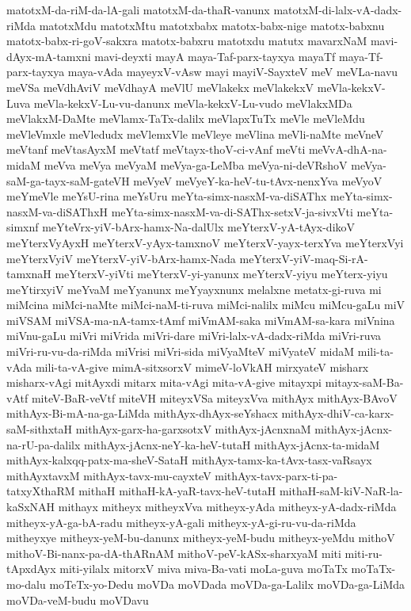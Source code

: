 {matotxM-da-riM-da-lA-gali
matotxM-da-thaR-vanunx
matotxM-di-lalx-vA-dadx-riMda
matotxMdu
matotxMtu
matotxbabx
matotx-babx-nige
matotx-babxnu
matotx-babx-ri-goV-sakxra
matotx-babxru
matotxdu
matutx
mavarxNaM
mavi-dAyx-mA-tamxni
mavi-deyxti
mayA
maya-Taf-parx-tayxya
mayaTf
maya-Tf-parx-tayxya
maya-vAda
mayeyxV-vAsw
mayi
mayiV-SayxteV
meV
meVLa-navu
meVSa
meVdhAviV
meVdhayA
meVlU
meVlakekx
meVlakekxV
meVla-kekxV-Luva
meVla-kekxV-Lu-vu-danunx
meVla-kekxV-Lu-vudo
meVlakxMDa
meVlakxM-DaMte
meVlamx-TaTx-dalilx
meVlapxTuTx
meVle
meVleMdu
meVleVmxle
meVledudx
meVlemxVle
meVleye
meVlina
meVli-naMte
meVneV
meVtanf
meVtasAyxM
meVtatf
meVtayx-thoV-ci-vAnf
meVti
meVvA-dhA-na-midaM
meVva
meVya
meVyaM
meVya-ga-LeMba
meVya-ni-deVRshoV
meVya-saM-ga-tayx-saM-gateVH
meVyeV
meVyeY-ka-heV-tu-tAvx-nenxYva
meVyoV
meYmeVle
meYsU-rina
meYsUru
meYta-simx-nasxM-va-diSAThx
meYta-simx-nasxM-va-diSAThxH
meYta-simx-nasxM-va-di-SAThx-setxV-ja-sivxVti
meYta-simxnf
meYteVrx-yiV-bArx-hamx-Na-dalUlx
meYterxV-yA-tAyx-dikoV
meYterxVyAyxH
meYterxV-yAyx-tamxnoV
meYterxV-yayx-terxYva
meYterxVyi
meYterxVyiV
meYterxV-yiV-bArx-hamx-Nada
meYterxV-yiV-maq-Si-rA-tamxnaH
meYterxV-yiVti
meYterxV-yi-yanunx
meYterxV-yiyu
meYterx-yiyu
meYtirxyiV
meYvaM
meYyanunx
meYyayxnunx
melalxne
metatx-gi-ruva
mi
miMcina
miMci-naMte
miMci-naM-ti-ruva
miMci-nalilx
miMcu
miMcu-gaLu
miV
miVSAM
miVSA-ma-nA-tamx-tAmf
miVmAM-saka
miVmAM-sa-kara
miVnina
miVnu-gaLu
miVri
miVrida
miVri-dare
miVri-lalx-vA-dadx-riMda
miVri-ruva
miVri-ru-vu-da-riMda
miVrisi
miVri-sida
miVyaMteV
miVyateV
midaM
mili-ta-vAda
mili-ta-vA-give
mimA-sitxsorxV
mimeV-loVkAH
mirxyateV
misharx
misharx-vAgi
mitAyxdi
mitarx
mita-vAgi
mita-vA-give
mitayxpi
mitayx-saM-Ba-vAtf
miteV-BaR-veVtf
miteVH
miteyxVSa
miteyxVva
mithAyx
mithAyx-BAvoV
mithAyx-Bi-mA-na-ga-LiMda
mithAyx-dhAyx-seYshacx
mithAyx-dhiV-ca-karx-saM-sithxtaH
mithAyx-garx-ha-garxsotxV
mithAyx-jAcnxnaM
mithAyx-jAcnx-na-rU-pa-dalilx
mithAyx-jAcnx-neY-ka-heV-tutaH
mithAyx-jAcnx-ta-midaM
mithAyx-kalxqq-patx-ma-sheV-SataH
mithAyx-tamx-ka-tAvx-tasx-vaRsayx
mithAyxtavxM
mithAyx-tavx-mu-cayxteV
mithAyx-tavx-parx-ti-pa-tatxyXthaRM
mithaH
mithaH-kA-yaR-tavx-heV-tutaH
mithaH-saM-kiV-NaR-la-kaSxNAH
mithayx
mitheyx
mitheyxVva
mitheyx-yAda
mitheyx-yA-dadx-riMda
mitheyx-yA-ga-bA-radu
mitheyx-yA-gali
mitheyx-yA-gi-ru-vu-da-riMda
mitheyxye
mitheyx-yeM-bu-danunx
mitheyx-yeM-budu
mitheyx-yeMdu
mithoV
mithoV-Bi-nanx-pa-dA-thARnAM
mithoV-peV-kASx-sharxyaM
miti
miti-ru-tApxdAyx
miti-yilalx
mitorxV
miva
miva-Ba-vati
moLa-guva
moTaTx
moTaTx-mo-dalu
moTeTx-yo-Dedu
moVDa
moVDada
moVDa-ga-Lalilx
moVDa-ga-LiMda
moVDa-veM-budu
moVDavu
}
